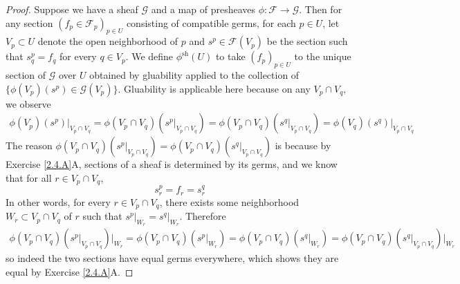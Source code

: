 \documentclass{article}
\newcommand{\fF}{\mathscr{F}}
\newcommand{\fG}{\mathscr{G}}
\DeclareMathOperator{\sh}{sh}
\begin{document}
\begin{proof}
    Suppose we have a sheaf $\fG$ and a map of presheaves $\phi:\fF\to \fG$. Then for any section $(f_p\in \fF_p)_{p\in U}$ consisting of compatible germs, for each $p\in U$, let $V_p\subset U$ denote the open neighborhood of $p$ and $s^p\in \fF(V_p)$ be the section such that $s^p_q=f_q$ for every $q\in V_p$. We define $\phi^{\sh}(U)$ to take $(f_p)_{p\in U}$ to the unique section of $\fG$ over $U$ obtained by gluability applied to the collection of $\{\phi(V_p)(s^p)\in \fG(V_p)\}$. Gluability is applicable here because on any $V_p\cap V_q$, we observe
    \begin{align*}
        \phi(V_p)(s^p)\vert_{V_p\cap V_q}=\phi(V_p\cap V_q)(s^p\vert_{V_p\cap V_q})=\phi(V_p\cap V_q)(s^q\vert_{V_p\cap V_q})=\phi(V_q)(s^q)\vert_{V_p\cap V_q}
    \end{align*}
    The reason $\phi(V_p\cap V_q)(s^p\vert_{V_p\cap V_q})=\phi(V_p\cap V_q)(s^q\vert_{V_p\cap V_q})$ is because by Exercise \ref{2.4.A}A, sections of a sheaf is determined by its germs, and we know that for all  $r\in V_p\cap V_q$,
    \[
    s^p_r=f_r=s^q_r
    \]
    In other words, for every $r\in V_p\cap V_q$, there exists some neighborhood $W_r\subset V_p\cap V_q$ of $r$ such that $s^p\vert_{W_r}=s^q\vert_{W_r}$. Therefore
    \begin{align*}
        \phi(V_p\cap V_q)(s^p\vert_{V_p\cap V_q})\vert_{W_r}=\phi(V_p\cap V_q)(s^p\vert_{W_r})=\phi(V_p\cap V_q)(s^q\vert_{W_r})=\phi(V_p\cap V_q)(s^q\vert_{V_p\cap V_q})\vert_{W_r}
    \end{align*}
    so indeed the two sections have equal germs everywhere, which shows they are equal by Exercise \ref{2.4.A}A.


\end{proof}
\end{document}
